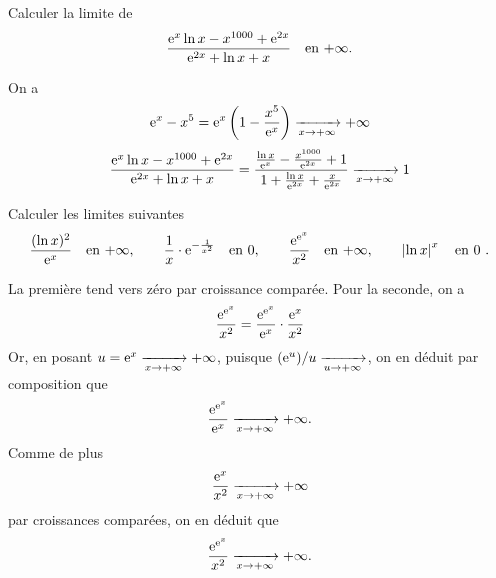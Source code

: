 \documentclass{magnoliaold}
\begin{document}
\begin{exos}
\exo Calculer la limite de
  \[\frac{{\rm e}^x\ln x-x^{1000}+{\rm e}^{2x}}{{\rm e}^{2x}+\ln x+x}
    \quad\text{en $+\infty$}.\]
    \begin{sol}
    On a
\[{\rm e}^x-x^5={\rm e}^x\left( 1-\frac{x^5}{{\rm e}^{x}}\right)\xrightarrow[x\rightarrow +\infty]{} +\infty\]
\[\frac{{\rm e}^x\ln x-x^{1000}+{\rm e}^{2x}}{{\rm e}^{2x}+\ln x+x} = \frac{\frac{\ln x}{{\rm e}^{x}}-\frac{x^{1000}}{{\rm e}^{2x}}+1}{1+\frac{\ln x}{{\rm e}^{2x}}+\frac{x}{{\rm e}^{2x}}}\xrightarrow[x\rightarrow +\infty]{} 1\]
    \end{sol}
\exo Calculer les limites suivantes
\[\frac{(\ln x)^2}{{\rm e}^x} \quad \text{en $+\infty$}, \qquad
  \frac{1}{x}\cdot {\rm e}^{-\frac{1}{x^2}} \quad \text{en 0}, \qquad
  \frac{{\rm e}^{{\rm e}^x}}{x^2} \quad\text{en $+\infty$}, \qquad
  \left|\ln x\right|^x \quad \text{en 0 .}\]
  \begin{sol}
    La première tend vers zéro par croissance comparée. Pour la seconde, on a
    \[\frac{{\rm e}^{{\rm e}^x}}{x^2}=\frac{{\rm e}^{{\rm e}^x}}{{\rm e}^x}\cdot\frac{{\rm e}^x}{x^2}\]
    Or, en posant $u={\rm e}^x\xrightarrow[x\rightarrow +\infty]{}+\infty$, puisque $({\rm e}^u)/u\xrightarrow[u\rightarrow +\infty]{}$, on en déduit par composition que
    \[\frac{{\rm e}^{{\rm e}^x}}{{\rm e}^x}\xrightarrow[x\rightarrow +\infty]{}+\infty.\]
    Comme de plus
    \[\frac{{\rm e}^x}{x^2}\xrightarrow[x\rightarrow +\infty]{}+\infty\]
    par croissances comparées, on en déduit que
    \[\frac{{\rm e}^{{\rm e}^x}}{x^2}\xrightarrow[x\rightarrow +\infty]{}+\infty.\]
        \end{sol}
\end{exos}
\end{document}
